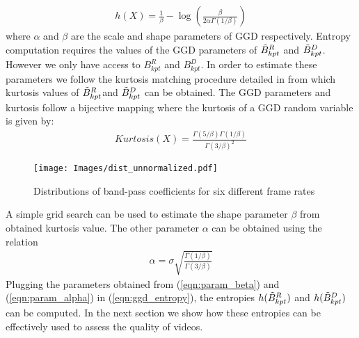 \documentclass[journal]{IEEEtran}
\begin{document}
\begin{align}
    h(X) = \frac{1}{\beta} - \log \left(\frac{\beta}{2\alpha\Gamma(1/\beta) }\right)
    \label{eqn:ggd_entropy}
\end{align}
where $\alpha$ and $\beta$ are the scale and shape parameters of GGD respectively. Entropy computation requires the values of the GGD parameters of $\Tilde{B}_{kpt}^R$ and $\Tilde{B}_{kpt}^D$. However we only have access to $B_{kpt}^R$ and $B_{kpt}^D$. In order to estimate these parameters we follow the kurtosis matching procedure detailed in \cite{soury2015new} from which kurtosis values of $\Tilde{B}_{kpt}^R$and $\Tilde{B}_{kpt}^D$ can be obtained. The GGD parameters and kurtosis follow a bijective mapping \cite{soury2015new} where the kurtosis of a GGD random variable is given by:
\begin{align}
    Kurtosis(X) = \frac{\Gamma(5/\beta)\Gamma(1/\beta)}{\Gamma(3/\beta)^2} 
    \label{eqn:param_beta}
\end{align}
\begin{figure}[t]
    \centering
    \texttt{[image: Images/dist\_unnormalized.pdf]}
    \caption{Distributions of band-pass coefficients for six different frame rates}
    \label{fig:fps_comparison}
\end{figure}

A simple grid search can be used to estimate the shape parameter $\beta$ from obtained kurtosis value. The other parameter $\alpha$ can be obtained using the relation 
\begin{align}
    \alpha = \sigma \sqrt{\frac{\Gamma(1/\beta)}{\Gamma(3/\beta)}}
    \label{eqn:param_alpha}
\end{align}
Plugging the parameters obtained from (\ref{eqn:param_beta}) and (\ref{eqn:param_alpha}) in (\ref{eqn:ggd_entropy}), the entropies $h(\Tilde{B}_{kpt}^R)$ and $h(\Tilde{B}_{kpt}^D)$ can be computed. In the next section we show how these entropies can be effectively used to assess the quality of videos.
\vspace{-7pt}
\end{document}
